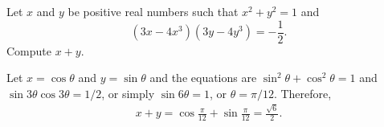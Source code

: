 %




\begin{question}[name={2012 HMMT, Guts, Problem 18}]
	Let $x$ and $y$ be positive real numbers such that $x^2+y^2=1$ and $$(3x-4x^3)(3y-4y^3)=-\frac{1}{2}.$$ Compute $x+y$.
\end{question}




\begin{solution}%
	Let $x=\cos \theta$ and $y=\sin \theta$ and the equations are $\sin^2\theta+\cos^2\theta=1$ and $\sin 3\theta \cos 3\theta = 1/2$, or simply $\sin 6\theta=1$, or $\theta = \pi/12$. Therefore,
	\begin{align*}
		x+y = \cos \frac{\pi}{12}+\sin \frac{\pi}{12} = \boxed{\frac{\sqrt{6}}{2}}.
	\end{align*}
\end{solution}

%
%
%
%
%
%
%
%
%
%
%
%
%
%	
%
%
%
%
%	
%
%
%
%
%
%	
%
%
%
%
%	
%
%
%
%
%
%	
%
%
%
%
%	
%
%
%
%
%




